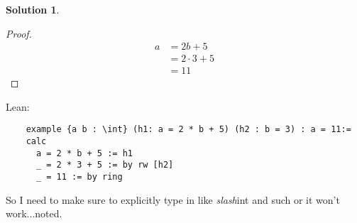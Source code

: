 \documentclass[12pt]{article}
\theoremstyle{definition} %
\newtheorem{solution}{Solution}
\theoremstyle{plain} %
\begin{document}
\begin{solution}
 \begin{proof}
    \begin{align}
        a &= 2b+5 \\[10pt] 
        &= 2 \cdot 3+ 5\\[10pt] 
        &= 11
    \end{align}
\end{proof}  
\end{solution}
Lean:
\begin{lstlisting}
    example {a b : \int} (h1: a = 2 * b + 5) (h2 : b = 3) : a = 11:=
    calc
      a = 2 * b + 5 := h1
      _ = 2 * 3 + 5 := by rw [h2]
      _ = 11 := by ring 
\end{lstlisting}
So I need to make sure to explicitly type in like \emph{slash}int and such or it won't work...noted.
\end{document}
